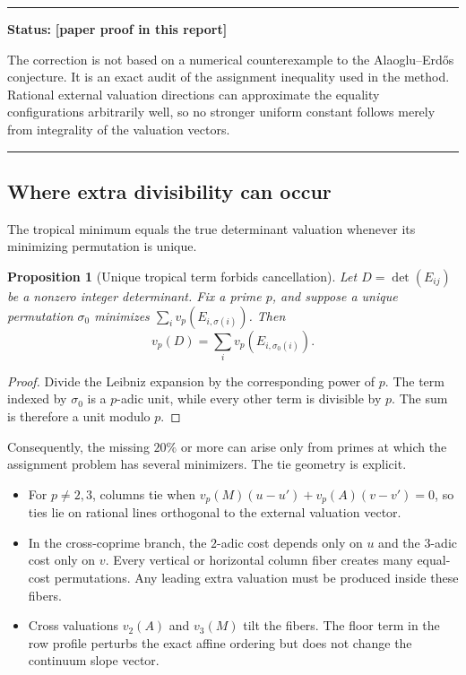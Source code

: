 \documentclass[11pt,oneside]{article}
\newtheorem{proposition}[theorem]{Proposition}
\theoremstyle{definition}
\theoremstyle{remark}
\newcommand{\statusnew}{\textcolor{newgreen}{\textbf{[paper proof in this report]}}}
\newenvironment{statusbox}[1]
{\begin{center}\begin{minipage}{0.94\textwidth}\raggedright\hbadness=10000\hrule
\vspace{0.45em}\textbf{Status:} #1\par\vspace{0.35em}}
{\vspace{0.35em}\hrule\end{minipage}\end{center}}
\begin{document}
\begin{statusbox}{\statusnew}
The correction is not based on a numerical counterexample to the Alaoglu--Erd\H{o}s
conjecture.  It is an exact audit of the assignment inequality used in the method.  Rational
external valuation directions can approximate the equality configurations arbitrarily well,
so no stronger uniform constant follows merely from integrality of the valuation vectors.
\end{statusbox}

\subsection{Where extra divisibility can occur}

The tropical minimum equals the true determinant valuation whenever its minimizing
permutation is unique.

\begin{proposition}[Unique tropical term forbids cancellation]\label{prop:unique-tropical}
Let $D=\det(E_{ij})$ be a nonzero integer determinant.  Fix a prime $p$, and suppose a unique
permutation $\sigma_0$ minimizes
$\sum_i v_p(E_{i,\sigma(i)})$.  Then
\[
  v_p(D)=\sum_i v_p(E_{i,\sigma_0(i)}).
\]
\end{proposition}

\begin{proof}
Divide the Leibniz expansion by the corresponding power of $p$.  The term indexed by
$\sigma_0$ is a $p$-adic unit, while every other term is divisible by $p$.  The sum is
therefore a unit modulo $p$.
\end{proof}

Consequently, the missing $20\%$ or more can arise only from primes at which the assignment
problem has several minimizers.  The tie geometry is explicit.

\begin{itemize}
\item For $p\ne2,3$, columns tie when
      $v_p(M)(u-u')+v_p(A)(v-v')=0$, so ties lie on rational lines orthogonal to the external
      valuation vector.
\item In the cross-coprime branch, the $2$-adic cost depends only on $u$ and the $3$-adic cost
      only on $v$.  Every vertical or horizontal column fiber creates many equal-cost
      permutations.  Any leading extra valuation must be produced inside these fibers.
\item Cross valuations $v_2(A)$ and $v_3(M)$ tilt the fibers.  The floor term in the row
      profile perturbs the exact affine ordering but does not change the continuum slope
      vector.
\end{itemize}
\end{document}

